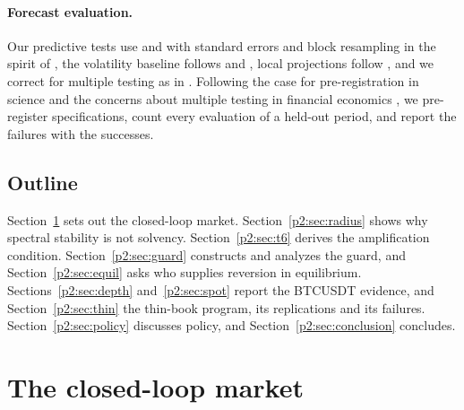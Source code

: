 \paragraph{Forecast evaluation.} Our predictive tests use \citet{p2:clark2007} and \citet{p2:diebold1995} with \citet{p2:newey1987} standard errors and block resampling in the spirit of \citet{p2:kunsch1989}, the volatility baseline follows \citet{p2:corsi2009} and \citet{p2:riskmetrics1996}, local projections follow \citet{p2:jorda2005}, and we correct for multiple testing as in \citet{p2:holm1979}. Following the case for pre-registration in science \citep{p2:nosek2018} and the concerns about multiple testing in financial economics \citep{p2:harvey2016,p2:harvey2017}, we pre-register specifications, count every evaluation of a held-out period, and report the failures with the successes.

\subsection{Outline}
Section~\ref{p2:sec:model} sets out the closed-loop market. Section~\ref{p2:sec:radius} shows why spectral stability is not solvency. Section~\ref{p2:sec:t6} derives the amplification condition. Section~\ref{p2:sec:guard} constructs and analyzes the guard, and Section~\ref{p2:sec:equil} asks who supplies reversion in equilibrium. Sections~\ref{p2:sec:depth} and~\ref{p2:sec:spot} report the BTCUSDT evidence, and Section~\ref{p2:sec:thin} the thin-book program, its replications and its failures. Section~\ref{p2:sec:policy} discusses policy, and Section~\ref{p2:sec:conclusion} concludes.
\section{The closed-loop market}\label{p2:sec:model}

